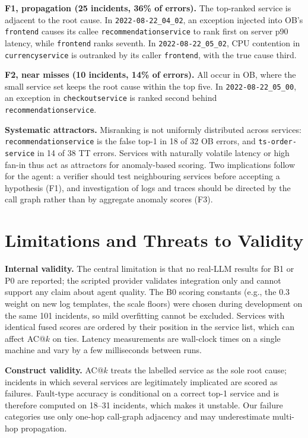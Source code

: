 \documentclass[conference]{IEEEtran}
\begin{document}
\textbf{F1, propagation (25 incidents, 36\% of errors).} The top-ranked service is adjacent to the root cause. In \texttt{2022-08-22\_04\_02}, an exception injected into OB's \texttt{frontend} causes its callee \texttt{recommendationservice} to rank first on server p90 latency, while \texttt{frontend} ranks seventh. In \texttt{2022-08-22\_05\_02}, CPU contention in \texttt{currencyservice} is outranked by its caller \texttt{frontend}, with the true cause third.

\textbf{F2, near misses (10 incidents, 14\% of errors).} All occur in OB, where the small service set keeps the root cause within the top five. In \texttt{2022-08-22\_05\_00}, an exception in \texttt{checkoutservice} is ranked second behind \texttt{recommendationservice}.

\textbf{Systematic attractors.} Misranking is not uniformly distributed across services: \texttt{recommendationservice} is the false top-1 in 18 of 32 OB errors, and \texttt{ts-order-service} in 14 of 38 TT errors. Services with naturally volatile latency or high fan-in thus act as attractors for anomaly-based scoring. Two implications follow for the agent: a verifier should test neighbouring services before accepting a hypothesis (F1), and investigation of logs and traces should be directed by the call graph rather than by aggregate anomaly scores (F3).

\section{Limitations and Threats to Validity}

\textbf{Internal validity.} The central limitation is that no real-LLM results for B1 or P0 are reported; the scripted provider validates integration only and cannot support any claim about agent quality. The B0 scoring constants (e.g., the 0.3 weight on new log templates, the scale floors) were chosen during development on the same 101 incidents, so mild overfitting cannot be excluded. Services with identical fused scores are ordered by their position in the service list, which can affect AC@$k$ on ties. Latency measurements are wall-clock times on a single machine and vary by a few milliseconds between runs.

\textbf{Construct validity.} AC@$k$ treats the labelled service as the sole root cause; incidents in which several services are legitimately implicated are scored as failures. Fault-type accuracy is conditional on a correct top-1 service and is therefore computed on 18--31 incidents, which makes it unstable. Our failure categories use only one-hop call-graph adjacency and may underestimate multi-hop propagation.
\end{document}
